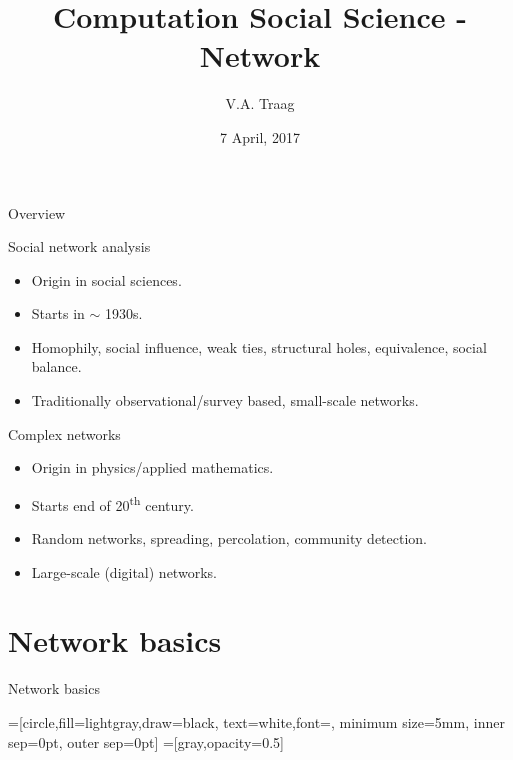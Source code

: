 \documentclass[hide notes,compress]{beamer}
\title{Computation Social Science - Network}
\author{V.A. Traag}
\institute{CWTS, Leiden University}
\date{7 April, 2017}
\begin{document}
\frame[label=title]{\titlepage}

\begin{frame}[label=overview,c]{Overview}
  \begin{block}{Social network analysis}
    \begin{itemize}
      \item Origin in social sciences.
      \item Starts in $\sim$ 1930s.
      \item Homophily, social influence, weak ties, structural holes,
            equivalence, social balance.
      \item Traditionally observational/survey based, small-scale networks.  
    \end{itemize}
  \end{block}
  \begin{block}{Complex networks}
    \begin{itemize}
      \item Origin in physics/applied mathematics.
      \item Starts end of 20\textsuperscript{th} century.
      \item Random networks, spreading, percolation, community detection.
      \item Large-scale (digital) networks.
    \end{itemize}
  \end{block}
\end{frame}

\section{Network basics}
\begin{frame}[c]
 \begin{center}
   \Huge
   Network basics
 \end{center}
\end{frame}

=[circle,fill=lightgray,draw=black,
               text=white,font=\tiny,
               minimum size=5mm,
               inner sep=0pt, outer sep=0pt]
=[gray,opacity=0.5]

\end{document}
